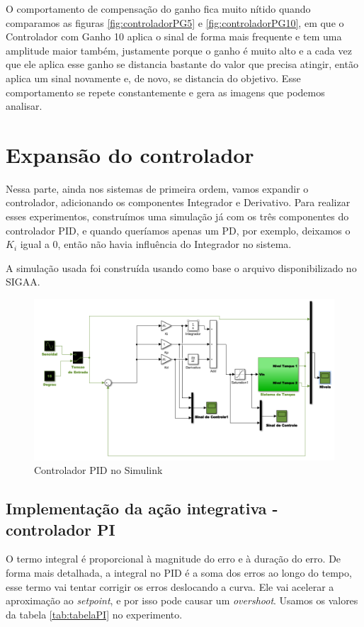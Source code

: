 \documentclass[
	12pt,				%
	openany,			%
	oneside,			%
	a4paper,			%
	english,			%
	french,				%
	spanish,			%
	brazil,				%
	]{abntex2}
\begin{document}
{O comportamento de compensação do ganho fica muito nítido quando comparamos as figuras \ref{fig:controladorPG5} e \ref{fig:controladorPG10}, em que o Controlador com Ganho 10 aplica o sinal de forma mais frequente e tem uma amplitude maior também, justamente porque o ganho é muito alto e a cada vez que ele aplica esse ganho se distancia bastante do valor que precisa atingir, então aplica um sinal novamente e, de novo, se distancia do objetivo. Esse comportamento se repete constantemente e gera as imagens que podemos analisar.

\clearpage
\section{Expansão do controlador}

Nessa parte, ainda nos sistemas de primeira ordem, vamos expandir o controlador, adicionando os componentes Integrador e Derivativo. Para realizar esses experimentos, construímos uma simulação já com os três componentes do controlador PID, e quando queríamos apenas um PD, por exemplo, deixamos o $K_i$ igual a 0, então não havia influência do Integrador no sistema. 

A simulação usada foi construída usando como base o arquivo disponibilizado no SIGAA.

\begin{figure}[h]
	\centering
	\includegraphics[scale=0.55]{Controlador_pid.PNG}
	\caption{Controlador PID no Simulink}
	\label{fig:controladorPID}
\end{figure}

\subsection{Implementação da ação integrativa - controlador PI}

O termo integral é proporcional à magnitude do erro e à duração do erro. De forma mais detalhada, a integral no PID é a soma dos erros ao longo do tempo, esse termo vai tentar corrigir os erros deslocando a curva. Ele vai acelerar a aproximação ao \textit{setpoint}, e por isso pode causar um \textit{overshoot}. Usamos os valores da tabela \ref{tab:tabelaPI} no experimento.

}
\end{document}
